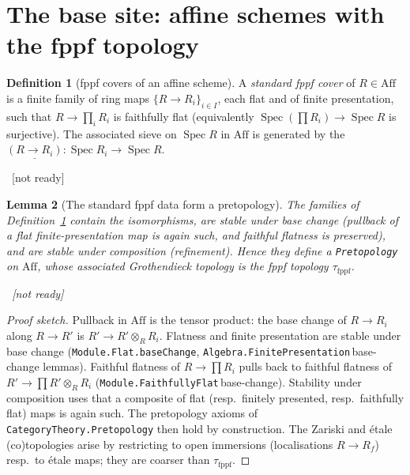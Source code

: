\documentclass[11pt]{article}
\newcommand{\lean}[1]{\par\smallskip\noindent{\footnotesize\texttt{Lean:\ #1}}\par}
\newcommand{\uses}[1]{}
\newcommand{\notready}{{\footnotesize\textcolor{red!60!black}{\ [not ready]}}}
\theoremstyle{definition}
\newtheorem{definition}{Definition}[section]
\theoremstyle{plain}
\newtheorem{lemma}[definition]{Lemma}
\theoremstyle{remark}
\newcommand{\Aff}{\mathrm{Aff}}
\newcommand{\Spec}{\operatorname{Spec}}
\begin{document}
\section{The base site: affine schemes with the fppf topology}\label{sec:base}

\begin{definition}[fppf covers of an affine scheme]\label{def:fppf-cover}
A \emph{standard fppf cover} of $R\in\Aff$ is a finite family of ring maps
$\{R\to R_i\}_{i\in I}$, each flat and of finite presentation, such that
$R\to\prod_i R_i$ is faithfully flat (equivalently $\Spec(\prod R_i)\to\Spec R$
is surjective).  The associated sieve on $\Spec R$ in $\Aff$ is generated by the
$\underline{(R\to R_i)}:\Spec R_i\to\Spec R$.
\lean{}\notready
\end{definition}

\begin{lemma}[The standard fppf data form a pretopology]\label{lem:fppf-pretop}
The families of Definition~\ref{def:fppf-cover} contain the isomorphisms, are
stable under base change (pullback of a flat finite-presentation map is again
such, and faithful flatness is preserved), and are stable under composition
(refinement).  Hence they define a \texttt{Pretopology} on $\Aff$, whose
associated Grothendieck topology is the \emph{fppf topology} $\tau_{\mathrm{fppf}}$.
\lean{}\notready
\uses{def:fppf-cover,def:site}
\end{lemma}
\begin{proof}[Proof sketch]
Pullback in $\Aff$ is the tensor product: the base change of $R\to R_i$ along
$R\to R'$ is $R'\to R'\otimes_R R_i$.  Flatness and finite presentation are
stable under base change (\texttt{Module.Flat.baseChange},
\texttt{Algebra.FinitePresentation}\,base-change lemmas).  Faithful flatness of
$R\to\prod R_i$ pulls back to faithful flatness of $R'\to\prod R'\otimes_R R_i$
(\texttt{Module.FaithfullyFlat}\,base-change).  Stability under composition uses
that a composite of flat (resp.\ finitely presented, resp.\ faithfully flat) maps
is again such.  The pretopology axioms of
\texttt{CategoryTheory.Pretopology} then hold by construction.  The Zariski and
étale (co)topologies arise by restricting to open immersions
(localisations $R\to R_f$) resp.\ to étale maps; they are coarser than
$\tau_{\mathrm{fppf}}$.
\end{proof}
\end{document}
